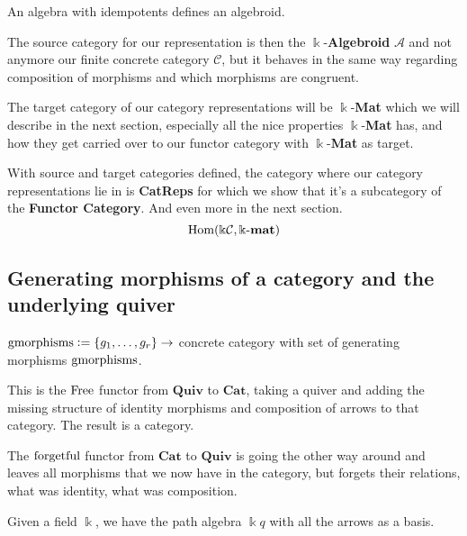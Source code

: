An algebra with idempotents defines an algebroid.

The source category for our representation is then the $\Bbbk$-\textbf{Algebroid} $\mathcal{A}$ and not anymore our finite concrete
category $\mathcal{C}$, but it behaves in the same way regarding composition of morphisms and which morphisms are congruent.

The target category of our category representations will be $\Bbbk$-\textbf{Mat} which we will describe in the next section,
especially all the nice properties $\Bbbk$-\textbf{Mat} has, and how they get carried over to our functor category with $\Bbbk$-\textbf{Mat} as
target.

With source and target categories defined, the category where our category representations lie in is \textbf{CatReps} for which we
show that it's a subcategory of the \textbf{Functor Category}. And even more in the next section.
\[
\textup{Hom}(\Bbbk\mathcal{C}, \Bbbk\textnormal{-}\mathbf{mat})
\]

\subsection{Generating morphisms of a category and the underlying quiver}

$\textup{gmorphisms} := \{g_{1},\dots,g_{r}\} \rightarrow$ concrete category with set of generating morphisms $\textup{gmorphisms}$.

This is the $\textup{Free}$ functor from $\mathbf{Quiv}$ to $\mathbf{Cat}$, taking a quiver and adding the missing structure of
identity morphisms and composition of arrows to that category. The result is a category.

The $\textup{forgetful}$ functor from $\mathbf{Cat}$ to $\mathbf{Quiv}$ is going the other way around and leaves all
morphisms that we now have in the category, but forgets their relations, what was identity, what was composition.

Given a field $\Bbbk$, we have the path algebra $\Bbbk q$ with all the arrows as a basis.

